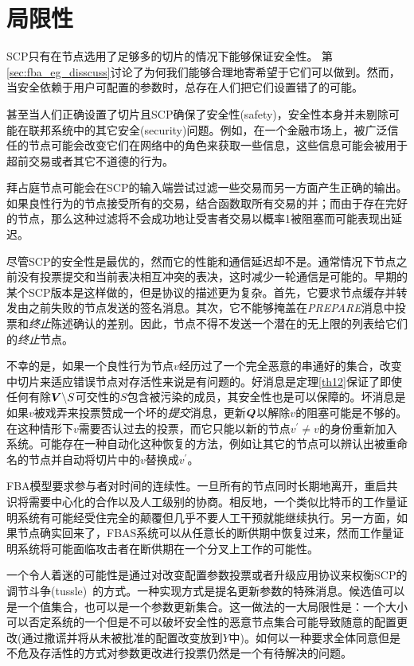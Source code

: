 \section{局限性}\label{sec:limit}

SCP只有在节点选用了足够多的{\quorum}切片的情况下能够保证安全性。	第\ref{sec:fba_eg_disscuss}讨论了为何我们能够合理地寄希望于它们可以做到。然而，当安全依赖于用户可配置的参数时，总存在人们把它们设置错了的可能。

甚至当人们正确设置了{\quorum}切片且SCP确保了安全性(safety)，安全性本身并未剔除可能在联邦系统中的其它安全(security)问题。例如，在一个金融市场上，被广泛信任的节点可能会改变它们在网络中的角色来获取一些信息，这些信息可能会被用于超前交易或者其它不道德的行为。

拜占庭节点可能会在SCP的输入端尝试过滤一些交易而另一方面产生正确的输出。如果良性行为的节点接受所有的交易，结合函数取所有交易的并；而由于存在完好的节点，那么这种过滤将不会成功地让受害者交易以概率1被阻塞而可能表现出延迟。

尽管SCP的安全性是最优的，然而它的性能和通信延迟却不是。通常情况下节点之前没有投票提交和当前表决相互冲突的表决，这时减少一轮通信是可能的。早期的某个SCP版本是这样做的，但是协议的描述更为复杂。首先，它要求节点缓存并转发由之前失败的节点发送的签名消息。其次，它不能够掩盖在\textsl{PREPARE}消息中投票和\textit{终止}陈述确认的差别。因此，节点不得不发送一个潜在的无上限的列表给它们的\textit{终止}节点。

不幸的是，如果一个良性行为节点$v$经历过了一个完全恶意的串通好的{\vblock}集合，改变{\slot}中切片来适应错误节点对存活性来说是有问题的。好消息是定理\ref{th12}保证了即使任何有除${\bm V}\backslash S${\quorum}可交性的$S$包含被污染的成员，其安全性也是可以保障的。坏消息是如果$v$被戏弄来投票赞成一个坏的\textit{提交}消息，更新${\bm Q}$以解除$v$的阻塞可能是不够的。在这种情形下$v$需要否认过去的投票，而它只能以新的节点$v^{\prime}\neq v$的身份重新加入系统。可能存在一种自动化这种恢复的方法，例如让其它的节点可以辨认出被重命名的节点并自动将切片中的$v$替换成$v^{\prime}$。

FBA模型要求参与者对时间的连续性。一旦所有的节点同时长期地离开，重启共识将需要中心化的合作以及人工级别的协商。相反地，一个类似比特币的工作量证明系统有可能经受住完全的颠覆但几乎不要人工干预就能继续执行。另一方面，如果节点确实回来了，FBAS系统可以从任意长的断供期中恢复过来，然而工作量证明系统将可能面临攻击者在断供期在一个分叉上工作的可能性。

一个令人着迷的可能性是通过对改变配置参数投票或者升级应用协议来权衡SCP的调节斗争(tussle)~\cite{Clark:2005:TCD:1074047.1074049}的方式。一种实现方式是提名更新参数的特殊消息。候选值可以是一个值集合，也可以是一个参数更新集合。这一做法的一大局限性是：一个大小可以否定系统的一个{\quorum}但是不可以破坏安全性的恶意节点集合可能导致随意的配置更改(通过撒谎并将从未被批准的配置改变放到$Y$中)。如何以一种要求全体{\quorum}同意但是不危及存活性的方式对参数更改进行投票仍然是一个有待解决的问题。